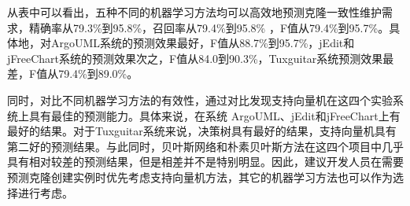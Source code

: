 从表中可以看出，五种不同的机器学习方法均可以高效地预测克隆一致性维护需求，精确率从79.3\%到95.8\%，召回率从79.4\%到95.8\% ，F值从79.4\%到95.7\%。具体地，对ArgoUML系统的预测效果最好，F值从88.7\%到95.7\%，jEdit和jFreeChart系统的预测效果次之，F值从84.0到90.3\%，Tuxguitar系统预测效果最差，F值从79.4\%到89.0\%。

同时，对比不同机器学习方法的有效性，通过对比发现支持向量机在这四个实验系统上具有最佳的预测能力。具体来说，在系统 ArgoUML、jEdit和jFreeChart上有最好的结果。对于Tuxguitar系统来说，决策树具有最好的结果，支持向量机具有第二好的预测结果。与此同时，贝叶斯网络和朴素贝叶斯方法在这四个项目中几乎具有相对较差的预测结果，但是相差并不是特别明显。因此，建议开发人员在需要预测克隆创建实例时优先考虑支持向量机方法，其它的机器学习方法也可以作为选择进行考虑。


